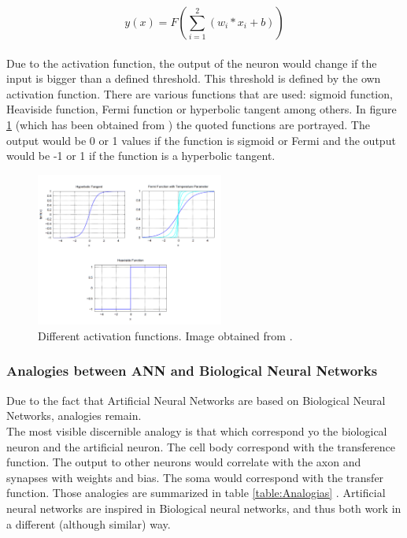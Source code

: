 			\begin{equation}
			y(x)=F(\sum_{i=1}^{2} (w_{i}*x_{i} + b) )
			\label{eq:ecuation_neuronasencilla}
			\end{equation}\\

Due to the activation function, the output of the neuron would change if the input is bigger than a defined threshold. This threshold is defined by the own activation function. There are various functions that are used: sigmoid function, Heaviside function, Fermi function or hyperbolic tangent among others. In figure \ref{fig:activation_function} (which has been obtained from \cite{BINN}) the quoted functions are portrayed. The output would be 0 or 1 values if the function is sigmoid or Fermi and the output would be -1 or 1 if the function is a hyperbolic tangent.

\begin{figure}[htb]
\centering
\includegraphics[width=0.55\textwidth]{images_miscelaneus/activation_function.PNG}
\caption{Different activation functions. Image obtained from \cite{BINN}.} \label{fig:activation_function}
\end{figure}

\subsubsection{Analogies between ANN and Biological Neural Networks}
Due to the fact that Artificial Neural Networks are based on Biological Neural Networks, analogies remain.\\

The most visible discernible analogy is that which correspond yo the biological neuron and the artificial neuron. The cell body correspond with the transference function. The output to other neurons would correlate with the axon and synapses with weights and bias. The soma would correspond with the transfer function. Those analogies are summarized in table \ref{table:Analogias} \cite{Analogies}. Artificial neural networks are inspired in Biological neural networks, and thus both work in a different (although similar) way.

